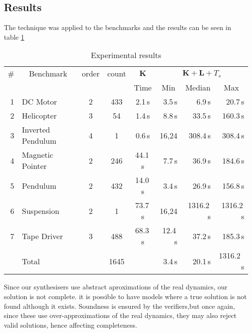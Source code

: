 \documentclass[sigconf]{llncs}
\newcommand{\mat}[1]{\boldsymbol{#1}}
\begin{document}
\subsection{Results}
\label{exp:results}
The technique was applied  to the benchmarks and the results can be seen in table \ref{tab:results}
\begin{table}
\centering
%
\begin{tabular}{| r | l | c | c | c | r | r | r |}
%
\hline
\# & \multicolumn{1}{|c|}{Benchmark} & \multicolumn{1}{|c|}{order} & \multicolumn{1}{|c|}{count} & \multicolumn{1}{|c|}{$\mat{K}$} & \multicolumn{3}{|c|}{$\mat{K}+\mat{L}+T_s$} \\
   &                                 & & & \multicolumn{1}{|c|}{Time} & \multicolumn{1}{|c|}{Min} & \multicolumn{1}{|c|}{Median} & \multicolumn{1}{|c|}{Max}\\\hline
1  & DC Motor          & 2 & 433 & 2.1\,s& 3.5\,s &   6.9\,s &   20.7\,s\\
2  & Helicopter        & 3  & 54 & 1.4\,s& 8.8\,s  &   33.5\,s & 160.3\,s\\
3  & Inverted Pendulum & 4 & 1 &   0.6\,s& 16,24  &  308.4\,s &  308.4\,s\\
4  & Magnetic Pointer  & 2  & 246 & 44.1\,s& 7.7\,s  &  36.9\,s &  184.6\,s \\
5  & Pendulum          & 2 & 432 & 14.0\,s& 3.4\,s  &   26.9\,s &   156.8\,s\\
6  & Suspension        & 2 & 1 & 73.7\,s& 16,24  &   1316.2\,s &   1316.2\,s\\
7  & Tape Driver       & 3 & 488 & 68.3\,s& 12.4\,s  &   37.2\,s &   185.3\,s\\
   & Total                 &   & 1645 & & 3.4\,s & 20.1\,s & 1316.2 \,s\\
\hline
%
\end{tabular}
\vspace{0.05in}
\caption{Experimental results\label{tab:results}}
\end{table}

Since our synthesisers use abstract aproximations of the real dynamics, our solution is not complete.
it is possible to have models where a true solution is not found although it exists.
Soundness is ensured by the verifiers,but once again, since these use over-approximations of the real dynamics, they may also reject valid solutions, hence affecting completeness. 
\end{document}
